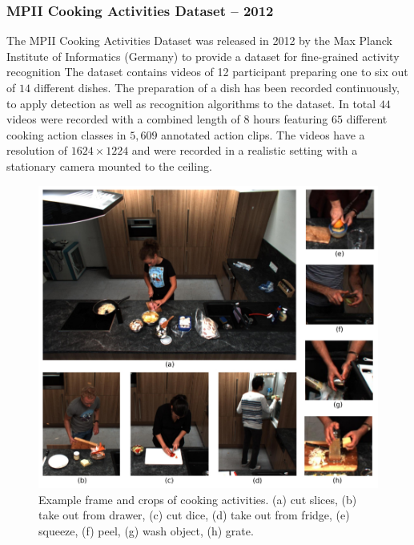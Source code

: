 \subsubsection{MPII Cooking Activities Dataset -- 2012}
The MPII Cooking Activities Dataset \cite{rohrbach_database_2012} was released in 2012 by the Max Planck Institute of Informatics (Germany) to provide a dataset for fine-grained activity recognition
The dataset contains videos of 12 participant preparing one to six out of $14$ different dishes.
The preparation of a dish has been recorded continuously, to apply detection as well as recognition algorithms to the dataset.
In total $44$ videos were recorded with a combined length of $8$ hours featuring $65$ different cooking action classes in $5,609$ annotated action clips.
The videos have a resolution of $1624 \times 1224$ and were recorded in a realistic setting with a stationary camera mounted to the ceiling.

\begin{figure}[H]
    \centering
    \includegraphics[width=\textwidth]{img_datasets/mpiicooking_example}
    \caption{Example frame and crops of cooking activities. (a) cut slices, (b) take out from drawer, (c) cut dice, (d) take out from fridge, (e) squeeze, (f) peel, (g) wash object, (h) grate. \cite{rohrbach_database_2012}}
    \label{fig:mpiicooking_example}
\end{figure}




